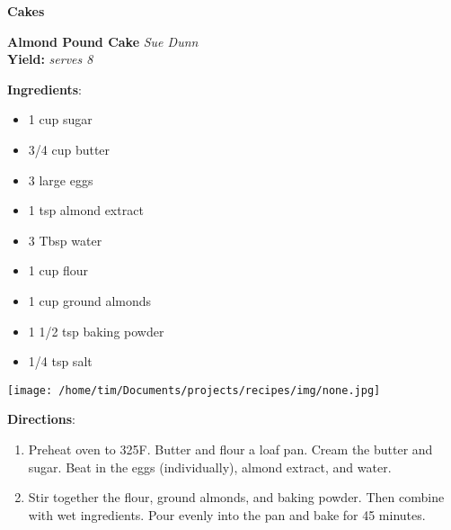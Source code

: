 \documentclass[11pt, twoside, openany]{book}
\begin{document}
{\newpage \LARGE \textbf{Cakes}} \label{cakes}\vspace{4mm}\\
\noindent\begin{minipage}[t]{\linewidth}%
{\Large\textbf{Almond Pound Cake}} \label{almond-pound-cake}\hfill\textit{Sue Dunn}\\
\textbf{Yield:} \textit{serves 8}\\
\noindent\begin{minipage}[t]{0.78\linewidth}%
\textbf{Ingredients}:\vspace{-3mm}
\begin{multicols}{2}
\begin{itemize}\setlength\itemsep{-1mm}
\item 1 cup sugar
\item 3/4 cup butter
\item 3 large eggs
\item 1 tsp almond extract
\item 3 Tbsp water
\item 1 cup flour
\item 1 cup ground almonds
\item 1 1/2 tsp baking powder
\item 1/4 tsp salt
\end{itemize}
\end{multicols}
\end{minipage}
\noindent\begin{minipage}[t]{0.18\linewidth}
\centering \strut\vspace*{-\baselineskip}\newline
\texttt{[image: /home/tim/Documents/projects/recipes/img/none.jpg]}\\
\end{minipage}\vspace{3mm}
\textbf{Directions}:
\vspace{-3mm}\begin{enumerate}\setlength\itemsep{-1mm}
\item Preheat oven to 325F. Butter and flour a loaf pan. Cream the butter and sugar. Beat in the eggs (individually), almond extract, and water.
\item Stir together the flour, ground almonds, and baking powder. Then combine with wet ingredients. Pour evenly into the pan and bake for 45 minutes.
\end{enumerate}
\end{minipage}\vspace{8mm}
\end{document}
